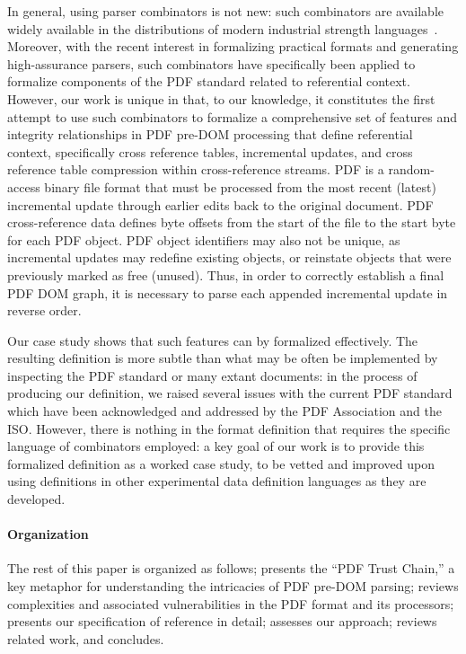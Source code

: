 In general, using parser combinators is not new: such combinators are
available widely available in the distributions of modern industrial
strength languages~\cite{leijen2001parsec,couprie2015nom,mundkurResearchReportParsley2020,bratus2017curing,willis2020staged}.
%
Moreover, with the recent interest in formalizing practical formats
and generating high-assurance parsers, such combinators have
specifically been applied to formalize components of the
PDF standard related to referential context.
%
However, our work is unique in that, to our knowledge, it constitutes
the first attempt to use such combinators to formalize a comprehensive
set of features and integrity relationships in PDF pre-DOM processing
that define referential context, specifically cross reference tables,
incremental updates, and cross reference table compression within
cross-reference streams. PDF is a random-access binary file format
that must be processed from the most recent (latest) incremental
update through earlier edits back to the original document.
%
PDF cross-reference data defines byte offsets from the start of the
file to the start byte for each PDF object. PDF object identifiers may
also not be unique, as incremental updates may redefine existing
objects, or reinstate objects that were previously marked as free
(unused).
%
Thus, in order to correctly establish a final PDF DOM graph, it is
necessary to parse each appended incremental update in reverse
order.

Our case study shows that such features can by formalized effectively.
%
The resulting definition is more subtle than what may be often be
implemented by inspecting the PDF standard or many extant documents:
in the process of producing our definition, we raised several issues
with the current PDF standard which have been acknowledged and
addressed by the PDF Association and the ISO.
%
However, there is nothing in the format definition that requires the
specific language of combinators employed: a key goal of our work is
to provide this formalized definition as a worked case study, to be
vetted and improved upon using definitions in other experimental data
definition languages as they are developed.

\paragraph*{Organization} The rest of this paper is organized as
follows;
%
 presents the ``PDF Trust Chain,'' a key metaphor
for understanding the intricacies of PDF pre-DOM parsing;
%
 reviews complexities and associated vulnerabilities in
the PDF format and its processors;
%
 presents our specification of reference in detail;
%
 assesses our approach;
%
 reviews related work, and %
 concludes.
